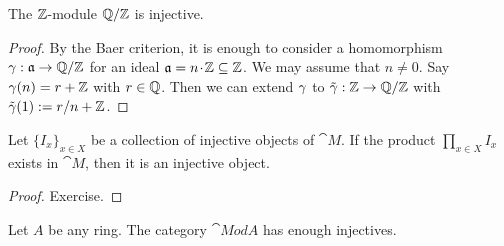 \begin{lem} \label{lem:1045}
The $\mathbb{Z}$-module $\mathbb{Q} / \mathbb{Z}$ is injective. 
\end{lem}

\begin{proof}
By the Baer criterion, it is enough to consider a homomorphism
$\gamma : \mathfrak{a} \to \mathbb{Q} / \mathbb{Z}$ for an ideal $\mathfrak{a} = n \mspace{1.5mu}{\cdot}\mspace{1.5mu} \mathbb{Z} \subseteq \mathbb{Z}$. We may 
assume that $n \neq 0$. Say $\gamma(n) = r + \mathbb{Z}$ with $r \in \mathbb{Q}$. 
Then we can extend $\gamma$ to $\tilde{\gamma} : \mathbb{Z} \to \mathbb{Q} / \mathbb{Z}$ with 
$\tilde{\gamma}(1) := r / n + \mathbb{Z}$. 
\end{proof}

\begin{lem}  \label{lem:1046}
Let $\{ I_x \}_{x \in X}$ be a collection of injective objects of $\cat{M}$. If
the product $\prod_{x \in X} I_x$ exists in $\cat{M}$, then it is an 
injective object.
\end{lem}

\begin{proof}
Exercise.
\end{proof}

\begin{thm} \label{thm:1115}
Let $A$ be any ring. The category $\cat{Mod} A$ has enough injectives.
\end{thm}

